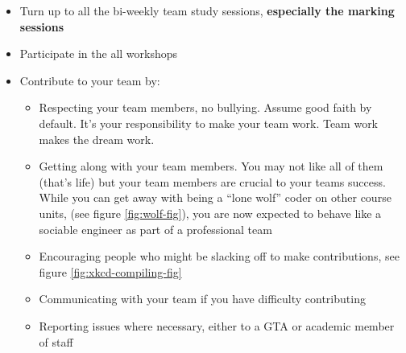 \documentclass[
]{book}
\providecommand{\tightlist}{%
  \setlength{\itemsep}{0pt}\setlength{\parskip}{0pt}}
\begin{document}
\begin{itemize}
\tightlist
\item
  Turn up to all the bi-weekly team study sessions, \textbf{especially the marking sessions}
\item
  Participate in the all workshops
\item
  Contribute to your team by:

  \begin{itemize}
  \tightlist
  \item
    Respecting your team members, no bullying. Assume good faith by default. It's your responsibility to make your team work. Team work makes the dream work.
  \item
    Getting along with your team members. You may not like all of them (that's life) but your team members are crucial to your teams success. While you can get away with being a ``lone wolf'' coder on other course units, (see figure \ref{fig:wolf-fig}), you are now expected to behave like a sociable engineer as part of a professional team
  \item
    Encouraging people who might be slacking off to make contributions, see figure \ref{fig:xkcd-compiling-fig}
  \item
    Communicating with your team if you have difficulty contributing
  \item
    Reporting issues where necessary, either to a GTA or academic member of staff
  \end{itemize}
\end{itemize}
\end{document}
